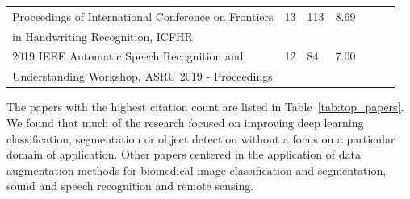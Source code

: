\documentclass[pdflatex,sn-mathphys]{sn-jnl}%
\theoremstyle{thmstyleone}
\theoremstyle{thmstyletwo}
\theoremstyle{thmstylethree}
\begin{document}
\begin{table}[ht]
\begin{center}
\begin{tabular*}{\textwidth}{@{\extracolsep{\fill}}lllllll@{\extracolsep{\fill}}}
        Proceedings of International Conference on Frontiers & 13 & 113 & 8.69 \\
        \vspace{.2cm}in Handwriting Recognition, ICFHR &&& \\

        2019 IEEE Automatic Speech Recognition and & 12 & 84 & 7.00 \\
        Understanding Workshop, ASRU 2019 - Proceedings &&& \\
        \bottomrule
    \end{tabular*}
    \end{center}
\end{table}

The papers with the highest citation count are listed in
Table~\ref{tab:top_papers}. We found that much of the research focused on
improving deep learning classification, segmentation or object detection
without a focus on a particular domain of application. Other papers centered
in the application of data augmentation methods for biomedical image
classification and segmentation, sound and speech recognition and remote
sensing.
\end{document}
